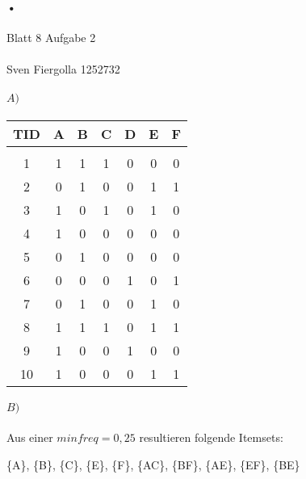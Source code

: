 \documentclass[10pt, a4paper]{article}
\begin{document}
\paragraph{•}
\begin{huge}
Blatt 8 Aufgabe 2
\end{huge}\par
\paragraph{}
\begin{small}
Sven Fiergolla 1252732
\end{small}\par

\paragraph{$A)$}

\begin{center}
\begin{tabular}{c||c|c|c|c|c|c}
\textbf{TID} & \textbf{A} & \textbf{B} & \textbf{C} & \textbf{D} & \textbf{E} & \textbf{F} \\
\hline \\
1 & 1 & 1 & 1 & 0 & 0 & 0 \\ \hline 
2 & 0 & 1 & 0 & 0 & 1 & 1 \\ \hline 
3 & 1 & 0 & 1 & 0 & 1 & 0 \\ \hline 
4 & 1 & 0 & 0 & 0 & 0 & 0 \\ \hline
5 & 0 & 1 & 0 & 0 & 0 & 0 \\ \hline
6 & 0 & 0 & 0 & 1 & 0 & 1 \\ \hline
7 & 0 & 1 & 0 & 0 & 1 & 0 \\ \hline
8 & 1 & 1 & 1 & 0 & 1 & 1 \\ \hline
9 & 1 & 0 & 0 & 1 & 0 & 0 \\ \hline
10 & 1 & 0 & 0 & 0 & 1 & 1 \\
\end{tabular}
\end{center}\par

\paragraph{$B)$}


Aus einer $minfreq = 0,25$ resultieren folgende Itemsets:\\
\bigskip
\begin{center}
\{A\}, \{B\}, \{C\}, \{E\}, \{F\}, \{AC\}, \{BF\}, \{AE\}, \{EF\}, \{BE\}
\end{center}
\par
\end{document}
